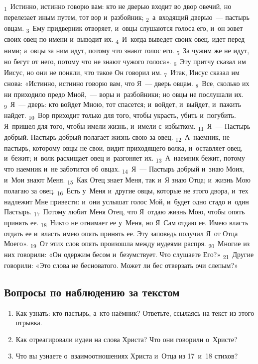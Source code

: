 \documentclass[a4paper,12pt]{article}
\begin{document}
\textsubscript{1}~Истинно, истинно говорю вам: кто не дверью входит во двор овечий, но перелезает иным путем, тот вор и~разбойник; \textsubscript{2}~а~входящий дверью~--- пастырь овцам. \textsubscript{3}~Ему придверник отворяет, и~овцы слушаются голоса его, и~он зовет своих овец по имени и~выводит их. \textsubscript{4}~И~когда выведет своих овец, идет перед ними; а~овцы за ним идут, потому что знают голос его. \textsubscript{5}~За чужим же не идут, но бегут от него, потому что не знают чужого голоса». \textsubscript{6}~Эту притчу сказал им Иисус, но они не поняли, что такое Он говорил им. \textsubscript{7}~Итак, Иисус сказал им снова: «Истинно, истинно говорю вам, что Я~— дверь овцам. \textsubscript{8}~Все, сколько их ни приходило предо Мной,~--- воры и~разбойники; но овцы не послушали их. \textsubscript{9}~Я~— дверь: кто войдет Мною, тот спасется; и~войдет, и~выйдет, и~пажить найдет. \textsubscript{10}~Вор приходит только для того, чтобы украсть, убить и~погубить. Я~пришел для того, чтобы имели жизнь, и~имели с~избытком. \textsubscript{11}~Я~— Пастырь добрый. Пастырь добрый полагает жизнь свою за овец. \textsubscript{12}~А~наемник, не пастырь, которому овцы не свои, видит приходящего волка, и~оставляет овец, и~бежит; и~волк расхищает овец и~разгоняет их. \textsubscript{13}~А~наемник бежит, потому что наемник и~не заботится об овцах. \textsubscript{14}~Я~— Пастырь добрый и~знаю Моих, и~Мои знают Меня. \textsubscript{15}~Как Отец знает Меня, так и~Я знаю Отца; и~жизнь Мою полагаю за овец. \textsubscript{16}~Есть у~Меня и~другие овцы, которые не этого двора, и~тех надлежит Мне привести: и~они услышат голос Мой, и~будет одно стадо и~один Пастырь. \textsubscript{17}~Потому любит Меня Отец, что Я~отдаю жизнь Мою, чтобы опять принять ее. \textsubscript{18}~Никто не отнимает ее у~Меня, но Я~Сам отдаю ее. Имею власть отдать ее и~власть имею опять принять ее. Эту заповедь получил Я~от Отца Моего». \textsubscript{19}~От этих слов опять произошла между иудеями распря. \textsubscript{20}~Многие из них говорили: «Он одержим бесом и~безумствует. Что слушаете Его?» \textsubscript{21}~Другие говорили: «Это слова не бесноватого. Может ли бес отверзать очи слепым?» 

\subsection*{Вопросы по наблюдению за текстом}
\begin{enumerate}
    \item Как узнать: кто пастырь, а~кто наёмник? Ответьте, ссылаясь на текст из этого отрывка. 
    
    \myline
    
    \myline
    \item Как отреагировали иудеи на слова Христа? Что они говорили о~Христе? 
    
    \myline
    
    \myline
    \item Что вы узнаете о~взаимоотношениях Христа и~Отца из 17~и~18 стихов? 
    
    \myline
    
    \myline
\end{enumerate}
\end{document}
